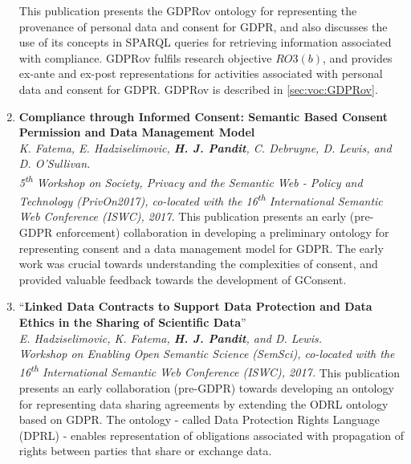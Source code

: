 \begin{enumerate}[start]
        \vspace{0.1cm} \newline
        This publication presents the GDPRov ontology for representing the provenance of personal data and consent for GDPR, and also discusses the use of its concepts in SPARQL queries for retrieving information associated with compliance. GDPRov fulfils research objective $RO3(b)$, and provides ex-ante and ex-post representations for activities associated with personal data and consent for GDPR. GDPRov is described in \autoref{sec:voc:GDPRov}.
    \item \textbf{Compliance through Informed Consent: Semantic Based Consent Permission and Data Management Model} \cite{fatema_compliance_2017} \\
    \textit{K. Fatema, E. Hadziselimovic, \textbf{H. J. Pandit}, C. Debruyne, D. Lewis, and D. O’Sullivan.} \\
    \textit{5\textsuperscript{th} Workshop on Society, Privacy and the Semantic Web - Policy and Technology (PrivOn2017), co-located with the 16\textsuperscript{th} International Semantic Web Conference (ISWC), 2017. }
        \vspace{0.1cm} \newline
        This publication presents an early (pre-GDPR enforcement) collaboration in developing a preliminary ontology for representing consent and a data management model for GDPR. The early work was crucial towards understanding the complexities of consent, and provided valuable feedback towards the development of GConsent.
    \item ``\textbf{Linked Data Contracts to Support Data Protection and Data Ethics in the Sharing of Scientific Data}'' \cite{hadziselimovic_linked_2017} \\ 
    \textit{E. Hadziselimovic, K. Fatema, \textbf{H. J. Pandit}, and D. Lewis.} \\ 
    \textit{Workshop on Enabling Open Semantic Science (SemSci), co-located with the 16\textsuperscript{th} International Semantic Web Conference (ISWC), 2017.}
        \vspace{0.1cm} \newline
        This publication presents an early collaboration (pre-GDPR) towards developing an ontology for representing data sharing agreements by extending the ODRL ontology based on GDPR. The ontology - called Data Protection Rights Language (DPRL) - enables representation of obligations associated with propagation of rights between parties that share or exchange data.
\end{enumerate}

